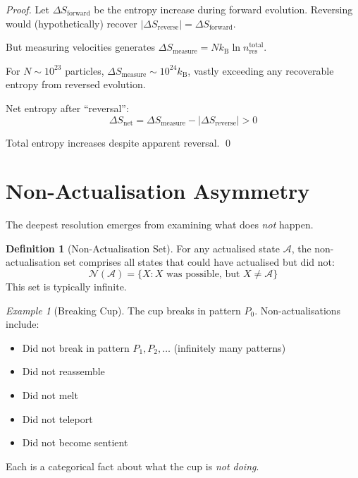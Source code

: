 \documentclass[twocolumn,10pt]{article}
\theoremstyle{definition}
\newtheorem{definition}[theorem]{Definition}
\theoremstyle{remark}
\newtheorem{example}[theorem]{Example}
\newcommand{\kB}{k_{\mathrm{B}}}
\begin{document}
\begin{proof}
Let $\Delta S_{\text{forward}}$ be the entropy increase during forward evolution. Reversing would (hypothetically) recover $|\Delta S_{\text{reverse}}| = \Delta S_{\text{forward}}$.

But measuring velocities generates $\Delta S_{\text{measure}} = N \kB \ln n_{\text{res}}^{\text{total}}$.

For $N \sim 10^{23}$ particles, $\Delta S_{\text{measure}} \sim 10^{24} \kB$, vastly exceeding any recoverable entropy from reversed evolution.

Net entropy after ``reversal'':
\begin{equation}
\Delta S_{\text{net}} = \Delta S_{\text{measure}} - |\Delta S_{\text{reverse}}| > 0
\end{equation}

Total entropy increases despite apparent reversal. \qed
\end{proof}

\section{Non-Actualisation Asymmetry}
\label{sec:non_actualisation}

The deepest resolution emerges from examining what does \textit{not} happen.

\begin{definition}[Non-Actualisation Set]
For any actualised state $\mathcal{A}$, the non-actualisation set comprises all states that could have actualised but did not:
\begin{equation}
\mathcal{N}(\mathcal{A}) = \{X : X \text{ was possible, but } X \neq \mathcal{A}\}
\end{equation}
This set is typically infinite.
\end{definition}

\begin{example}[Breaking Cup]
The cup breaks in pattern $P_0$. Non-actualisations include:
\begin{itemize}
\item Did not break in pattern $P_1, P_2, \ldots$ (infinitely many patterns)
\item Did not reassemble
\item Did not melt
\item Did not teleport
\item Did not become sentient
\end{itemize}
Each is a categorical fact about what the cup is \textit{not doing}.
\end{example}
\end{document}
